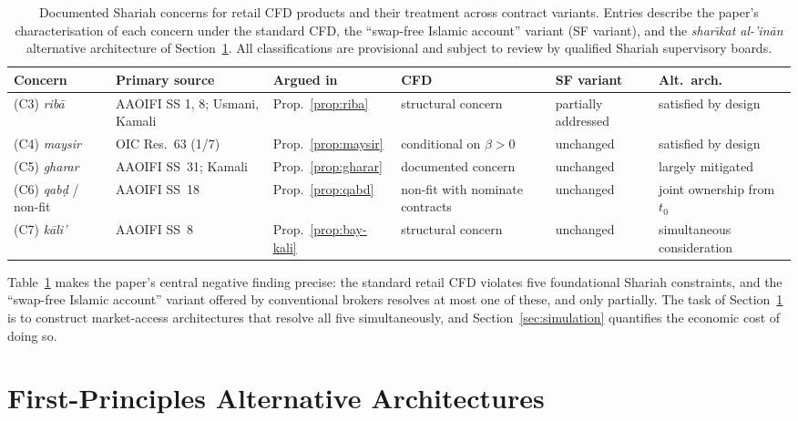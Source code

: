 \documentclass[preprint,12pt,authoryear]{elsarticle}
\theoremstyle{definition}
\begin{document}
\begin{table}[!ht]
\centering
\small
\caption{Documented Shariah concerns for retail CFD products and
their treatment across contract variants. Entries describe the
paper's characterisation of each concern under the standard CFD,
the ``swap-free Islamic account'' variant (SF variant), and the
\emph{shar\={\i}kat al-'in\={a}n} alternative architecture of
Section~\ref{sec:alternatives}. All classifications are
provisional and subject to review by qualified Shariah supervisory
boards.}
\label{tab:violation-summary}
\begin{tabular}{@{}p{2.6cm}p{2.6cm}p{1.9cm}p{2.4cm}p{2.0cm}p{2.4cm}@{}}
\toprule
\textbf{Concern} & \textbf{Primary source}
    & \textbf{Argued in}
    & \textbf{CFD} & \textbf{SF variant}
    & \textbf{Alt.\ arch.} \\
\midrule
(C3) \emph{rib\={a}}
    & AAOIFI SS 1, 8; Usmani, Kamali
    & Prop.~\ref{prop:riba}
    & structural concern
    & partially addressed
    & satisfied by design \\
(C4) \emph{maysir}
    & OIC Res.~63 (1/7)
    & Prop.~\ref{prop:maysir}
    & conditional on $\beta > 0$
    & unchanged
    & satisfied by design \\
(C5) \emph{gharar}
    & AAOIFI SS~31; Kamali
    & Prop.~\ref{prop:gharar}
    & documented concern
    & unchanged
    & largely mitigated \\
(C6) \emph{qab\d{d}} / non-fit
    & AAOIFI SS~18
    & Prop.~\ref{prop:qabd}
    & non-fit with nominate contracts
    & unchanged
    & joint ownership from $t_0$ \\
(C7) \emph{k\={a}li'}
    & AAOIFI SS~8
    & Prop.~\ref{prop:bay-kali}
    & structural concern
    & unchanged
    & simultaneous consideration \\
\bottomrule
\end{tabular}
\end{table}

Table~\ref{tab:violation-summary} makes the paper's central
negative finding precise: the standard retail CFD violates five
foundational Shariah constraints, and the ``swap-free Islamic
account'' variant offered by conventional brokers resolves at most
one of these, and only partially. The task of
Section~\ref{sec:alternatives} is to construct market-access
architectures that resolve all five simultaneously, and
Section~\ref{sec:simulation} quantifies the economic cost of doing
so.

\section{First-Principles Alternative Architectures}
\label{sec:alternatives}
\end{document}
